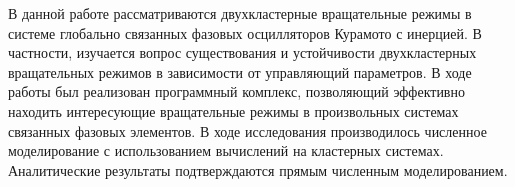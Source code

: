 В данной работе рассматриваются двухкластерные вращательные режимы в системе глобально связанных фазовых осцилляторов Курамото с инерцией.
В частности, изучается вопрос существования и устойчивости двухкластерных вращательных режимов в зависимости от управляющий параметров.
В ходе работы был реализован программный комплекс, позволяющий эффективно находить интересующие вращательные
режимы в произвольных системах связанных фазовых элементов. 
В ходе исследования производилось численное моделирование с использованием вычислений на кластерных системах.
Аналитические результаты подтверждаются прямым численным моделированием.
